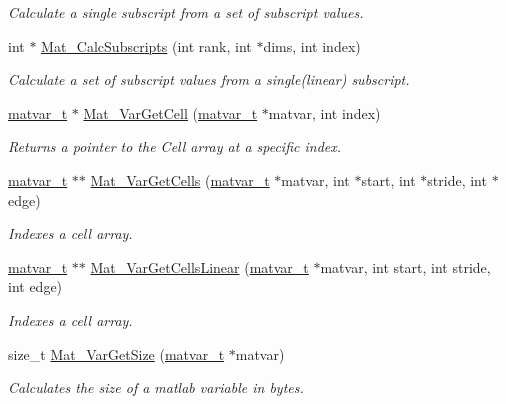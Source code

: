\begin{DoxyCompactItemize}
\begin{DoxyCompactList}\small\item\em \-Calculate a single subscript from a set of subscript values. \end{DoxyCompactList}\item 
int $\ast$ \hyperlink{group__MAT_gabe2571a4b9b6cff3b31aa6f152deba61}{\-Mat\-\_\-\-Calc\-Subscripts} (int rank, int $\ast$dims, int index)
\begin{DoxyCompactList}\small\item\em \-Calculate a set of subscript values from a single(linear) subscript. \end{DoxyCompactList}\item 
\hyperlink{structmatvar__t}{matvar\-\_\-t} $\ast$ \hyperlink{group__MAT_gac1e15063439c0bd3eb0c986514c742dc}{\-Mat\-\_\-\-Var\-Get\-Cell} (\hyperlink{structmatvar__t}{matvar\-\_\-t} $\ast$matvar, int index)
\begin{DoxyCompactList}\small\item\em \-Returns a pointer to the \-Cell array at a specific index. \end{DoxyCompactList}\item 
\hyperlink{structmatvar__t}{matvar\-\_\-t} $\ast$$\ast$ \hyperlink{group__MAT_ga0732b0a6c40975b036068b9a14422d45}{\-Mat\-\_\-\-Var\-Get\-Cells} (\hyperlink{structmatvar__t}{matvar\-\_\-t} $\ast$matvar, int $\ast$start, int $\ast$stride, int $\ast$edge)
\begin{DoxyCompactList}\small\item\em \-Indexes a cell array. \end{DoxyCompactList}\item 
\hyperlink{structmatvar__t}{matvar\-\_\-t} $\ast$$\ast$ \hyperlink{group__MAT_ga004987d665654409f74eaf8e82bb1380}{\-Mat\-\_\-\-Var\-Get\-Cells\-Linear} (\hyperlink{structmatvar__t}{matvar\-\_\-t} $\ast$matvar, int start, int stride, int edge)
\begin{DoxyCompactList}\small\item\em \-Indexes a cell array. \end{DoxyCompactList}\item 
size\-\_\-t \hyperlink{group__MAT_gaeeb798fead2f765bddfb19016c7fdbcc}{\-Mat\-\_\-\-Var\-Get\-Size} (\hyperlink{structmatvar__t}{matvar\-\_\-t} $\ast$matvar)
\begin{DoxyCompactList}\small\item\em \-Calculates the size of a matlab variable in bytes. \end{DoxyCompactList}\item 

\end{DoxyCompactItemize}
